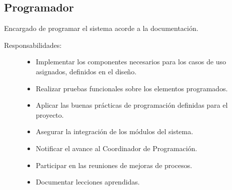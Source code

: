 \subsection{Programador}
	Encargado de programar el sistema acorde a la documentación.
\begin{description}
	\item[Responsabilidades:] \cdtEmpty 	
    \begin{itemize}
    	\item Implementar los componentes necesarios para los casos de uso asignados, definidos en el diseño.
    	\item Realizar pruebas funcionales sobre los elementos programados.
    	\item Aplicar las buenas prácticas de programación definidas para el proyecto.
    	\item Asegurar la integración de los módulos del sistema.
    	\item Notificar el avance al Coordinador de Programación.
    	\item Participar en las reuniones de mejoras de procesos.
    	\item Documentar lecciones aprendidas.
    \end{itemize}
\end{description}


